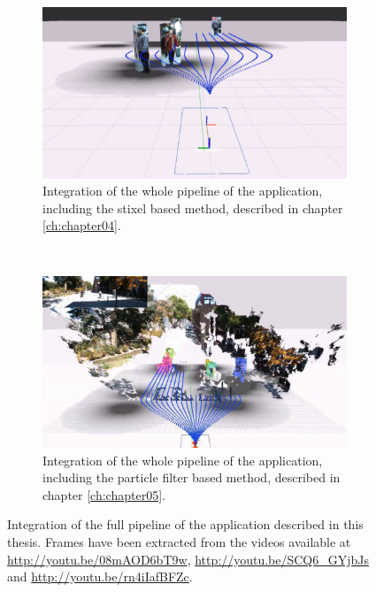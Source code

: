 \begin{figure}[p]
\centering
  \begin{subfigure}[b]{\textwidth}
    \centering
    \includegraphics[width=\textwidth, height=0.75\textwidth]{stixels_whole_pipeline}
    \caption{Integration of the whole pipeline of the application, including the stixel based method, described in chapter \ref{ch:chapter04}.}\label{fig:cp07_stixels_whole_pipeline}
  \end{subfigure}
  ~
  \begin{subfigure}[b]{\textwidth}
    \centering
    \includegraphics[width=\textwidth, height=0.75\textwidth]{particle_filter_whole_pipeline}
    \caption{Integration of the whole pipeline of the application, including the particle filter based method, described in chapter \ref{ch:chapter05}.}\label{fig:cp07_particle_filter_whole_pipeline}
  \end{subfigure}
  \caption{Integration of the full pipeline of the application described in this thesis. Frames have been extracted from the videos available at \url{http://youtu.be/08mAOD6bT9w}, \url{http://youtu.be/SCQ6_GYjbJs} and \url{http://youtu.be/rn4iIafBFZc}.}\label{fig:cp07_whole_pipeline}
\end{figure}


